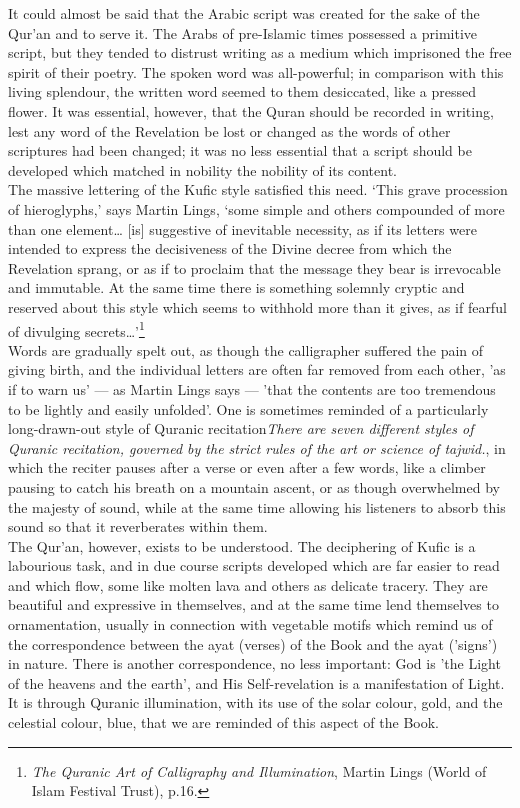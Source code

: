 \documentclass[10pt, twoside]{book}
\begin{document}
It could almost be said that the Arabic script was created for the sake of the Qur'an and to serve 
it. The Arabs of pre\hyp{}Islamic times possessed a primitive script, but they tended to distrust writing 
as a medium which imprisoned the free spirit of their poetry. The spoken word was all\hyp{}powerful; in 
comparison with this living splendour, the written word seemed to them desiccated, like a pressed 
flower. It was essential, however, that the Quran should be recorded in writing, lest any word of the 
Revelation be lost or changed as the words of other scriptures had been changed; it was no less 
essential that a script should be developed which matched in nobility the nobility of its content. \\

The massive lettering of the Kufic style satisfied this need. `This grave procession of hieroglyphs,' 
says Martin Lings, `some simple and others compounded of more than one element\ldots{} [is] suggestive 
of inevitable necessity, as if its letters were intended to express the decisiveness of the Divine 
decree from which the Revelation sprang, or as if to proclaim that the message they bear is 
irrevocable and immutable. At the same time there is something solemnly cryptic and reserved about 
this style which seems to withhold more than it gives, as if fearful of divulging secrets\ldots{}'\footnote{\emph{The Quranic Art of Calligraphy and Illumination}, Martin Lings (World of Islam Festival Trust), p.16.}\\

Words are gradually spelt out, as though the calligrapher suffered the pain of giving birth, and the 
individual letters are often far removed from each other, 'as if to warn us' --- as Martin Lings says --- 
'that the contents are too tremendous to be lightly and easily unfolded'. One is sometimes reminded 
of a particularly long\hyp{}drawn\hyp{}out style of Quranic recitation\emph{There are seven different styles of Quranic recitation, governed by the strict rules of the art or 
science of tajwid.}, in which the reciter pauses after a 
verse or even after a few words, like a climber pausing to catch his breath on a mountain ascent, or 
as though overwhelmed by the majesty of sound, while at the same time allowing his listeners to 
absorb this sound so that it reverberates within them.\\ 

The Qur'an, however, exists to be understood. The deciphering of Kufic is a labourious task, and in 
due course scripts developed which are far easier to read and which flow, some like molten lava and 
others as delicate tracery. They are beautiful and expressive in themselves, and at the same time 
lend themselves to ornamentation, usually in connection with vegetable motifs which remind us of the 
correspondence between the ayat (verses) of the Book and the ayat ('signs') in nature. There is 
another correspondence, no less important: God is 'the Light of the heavens and the earth', and His 
Self\hyp{}revelation is a manifestation of Light. It is through Quranic illumination, with its use of the 
solar colour, gold, and the celestial colour, blue, that we are reminded of this aspect of the Book. \\
\end{document}
